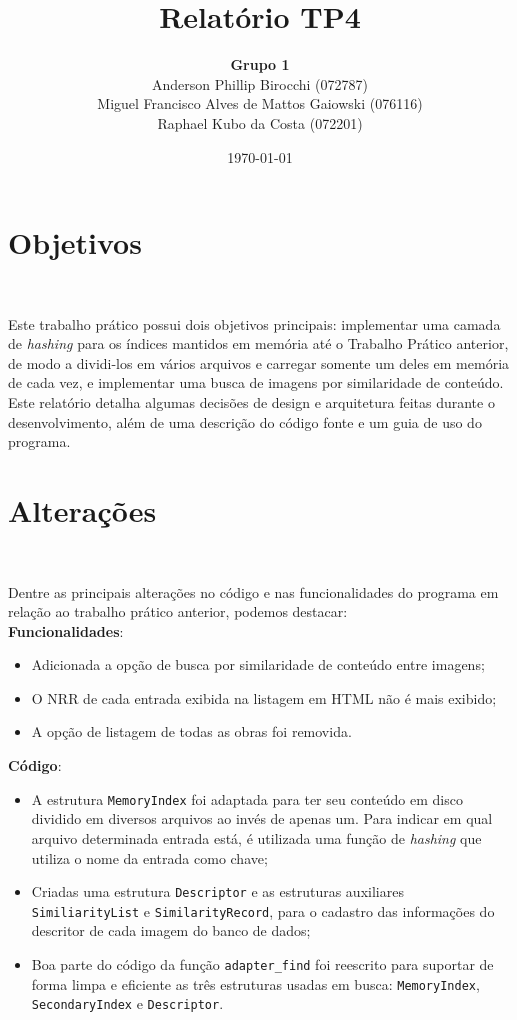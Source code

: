 \documentclass{article}
\title{\textbf{Relatório TP4}}
\author{\textbf{Grupo 1} \\
  Anderson Phillip Birocchi (072787) \\
  Miguel Francisco Alves de Mattos Gaiowski (076116) \\
  Raphael Kubo da Costa (072201)}
\date{\today}
\begin{document}
\maketitle

\section{Objetivos}\

Este trabalho prático possui dois objetivos principais: implementar uma camada de \textit{hashing} para os índices mantidos em memória até o Trabalho Prático anterior, de modo a dividi-los em vários arquivos e carregar somente um deles em memória de cada vez, e implementar uma busca de imagens por similaridade de conteúdo.\\

Este relatório detalha algumas decisões de design e arquitetura feitas durante o desenvolvimento, além de uma descrição do código fonte e um guia de uso do programa.

\section{Alterações}\

Dentre as principais alterações no código e nas funcionalidades do programa em relação ao trabalho prático anterior, podemos destacar:\\

\textbf{Funcionalidades}:
\begin{itemize}
\item Adicionada a opção de busca por similaridade de conteúdo entre imagens;
\item O NRR de cada entrada exibida na listagem em HTML não é mais exibido;
\item A opção de listagem de todas as obras foi removida.
\end{itemize}

\textbf{Código}:
\begin{itemize}
\item A estrutura \texttt{MemoryIndex} foi adaptada para ter seu conteúdo em disco dividido em diversos arquivos ao invés de apenas um. Para indicar em qual arquivo determinada entrada está, é utilizada uma função de \textit{hashing} que utiliza o nome da entrada como chave;
\item Criadas uma estrutura \texttt{Descriptor} e as estruturas auxiliares \texttt{SimiliarityList} e \texttt{SimilarityRecord}, para o cadastro das informações do descritor de cada imagem do banco de dados;
\item Boa parte do código da função \texttt{adapter\_find} foi reescrito para suportar de forma limpa e eficiente as três estruturas usadas em busca: \texttt{MemoryIndex}, \texttt{SecondaryIndex} e \texttt{Descriptor}.
\end{itemize}
\end{document}
